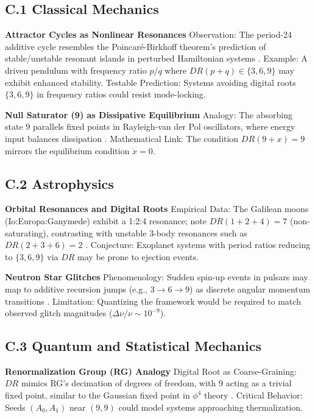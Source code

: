 \documentclass[12pt]{article}
\begin{document}
\subsection{C.1 Classical Mechanics}

\textbf{Attractor Cycles as Nonlinear Resonances}  
Observation: The period-24 additive cycle resembles the Poincaré-Birkhoff theorem’s prediction of stable/unstable resonant islands in perturbed Hamiltonian systems \cite{lichtenberg1992regular}.  
Example: A driven pendulum with frequency ratio \( p/q \) where \( DR(p + q) \in \{3,6,9\} \) may exhibit enhanced stability.  
Testable Prediction: Systems avoiding digital roots \( \{3,6,9\} \) in frequency ratios could resist mode-locking.

\bigskip

\textbf{Null Saturator (9) as Dissipative Equilibrium}  
Analogy: The absorbing state \( 9 \) parallels fixed points in Rayleigh-van der Pol oscillators, where energy input balances dissipation \cite{strogatz2018nonlinear}.  
Mathematical Link: The condition \( DR(9 + x) = 9 \) mirrors the equilibrium condition \( \dot{x} = 0 \).

\subsection{C.2 Astrophysics}

\textbf{Orbital Resonances and Digital Roots}  
Empirical Data: The Galilean moons (Io:Europa:Ganymede) exhibit a 1:2:4 resonance; note \( DR(1 + 2 + 4) = 7 \) (non-saturating), contrasting with unstable 3-body resonances such as \( DR(2 + 3 + 6) = 2 \) \cite{murray1999solar}.  
Conjecture: Exoplanet systems with period ratios reducing to \( \{3,6,9\} \) via \( DR \) may be prone to ejection events.

\bigskip

\textbf{Neutron Star Glitches}  
Phenomenology: Sudden spin-up events in pulsars may map to additive recursion jumps (e.g., \( 3 \rightarrow 6 \rightarrow 9 \)) as discrete angular momentum transitions \cite{anderson1975nature}.  
Limitation: Quantizing the framework would be required to match observed glitch magnitudes (\( \Delta \nu / \nu \sim 10^{-9} \)).

\subsection{C.3 Quantum and Statistical Mechanics}

\textbf{Renormalization Group (RG) Analogy}  
Digital Root as Coarse-Graining: \( DR \) mimics RG’s decimation of degrees of freedom, with 9 acting as a trivial fixed point, similar to the Gaussian fixed point in \( \phi^4 \) theory \cite{kardar2007statistical}.  
Critical Behavior: Seeds \( (A_0, A_1) \) near \( (9, 9) \) could model systems approaching thermalization.
\end{document}
